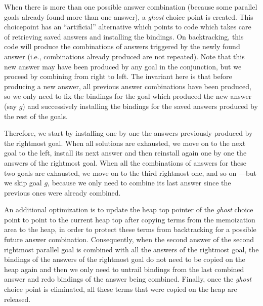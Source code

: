 \documentclass{tlp}
\begin{document}
When there is more than one possible answer combination (because some
parallel goals already found more than one answer), a \emph{ghost}
choice point is created.
This choicepoint has an ``artificial'' alternative which points to
code which takes care of retrieving saved answers and installing the
bindings. 
On backtracking, this code will produce the combinations of answers
triggered by the newly found answer (i.e., combinations already
produced are not repeated).  Note that this new answer may have been
produced by any goal in the conjunction, but we proceed by combining
from right to left.  The invariant here is that before producing a new
answer, all previous answer combinations have been produced, so we
only need to fix the bindings for the goal which produced the new
answer (say $g$) and successively installing the bindings for the
saved answers produced by the rest of the goals.

Therefore, we start by installing one by one the answers previously
produced by the rightmost goal.
When all solutions are exhausted, we move on to the next goal to the
left, install its next answer and then reinstall again one by one
the answers of the rightmost goal.  When all the combinations of
answers for these two goals are exhausted, we move on to the third
rightmost one, and so on ---but we skip goal $g$, because we only need
to combine its last answer since the previous ones were already
combined.



An additional optimization
is to update the heap top
pointer of the \emph{ghost} choice point to point to the current heap
top after copying terms from the memoization area to the heap, in
order to protect these terms from backtracking for a possible future
answer combination.  Consequently, when the second answer of the
second rightmost parallel goal is combined with all the answers of the
rightmost goal, the bindings of the answers of the rightmost goal do
not need to be copied on the heap again and then we only need to
untrail bindings from the last combined answer and redo bindings of
the answer being combined.  Finally, once the \emph{ghost} choice
point is eliminated, all these terms that were copied on the heap are
released.
\end{document}
